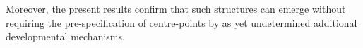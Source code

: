 \documentclass[9pt,twocolumn,twoside,lineno]{pnas-new}
\begin{document}
Moreover, the present results confirm that such structures can emerge without requiring the pre-specification of centre-points by as yet undetermined additional developmental mechanisms.




\end{document}
